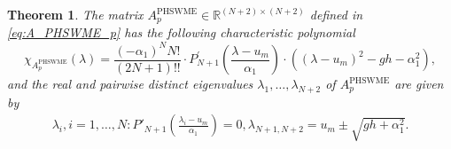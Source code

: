 \documentclass[a4paper, 11pt]{article}
\newtheorem{theorem}{Theorem}
\begin{document}
\begin{theorem}\label{th:APHSWME_p_chi}
    The matrix $A^{\textrm{PHSWME}}_{p} \in \mathbb{R}^{(N+2)\times(N+2)}$ defined in \eqref{eq:A_PHSWME_p} has the following characteristic polynomial
    \begin{equation}\label{eq:APHSWME_p_char_poly}
        \chi_{A^{\textrm{PHSWME}}_{p}}(\lambda) = \frac{(-\alpha_1)^NN!}{(2N+1)!!} \cdot P^{'}_{N+1}\left(\frac{\lambda -u_m}{\alpha_1}\right) \cdot \left( \left( \lambda - u_m \right)^2 - gh - \alpha_1^2 \right),
    \end{equation}
    and the real and pairwise distinct eigenvalues $\lambda_1, \ldots, \lambda_{N+2}$ of $A^{\textrm{PHSWME}}_{p}$ are given by
    \begin{eqnarray}\label{eq:APHSWME_p_EV}
        \lambda_i, i=1,\ldots, N: P'_{N+1}\left(\frac{\lambda_i - u_m}{\alpha_1}\right)=0,
        \lambda_{N+1,N+2} = u_m \pm \sqrt{gh + \alpha_1^2}.
    \end{eqnarray}
\end{theorem}
\end{document}
